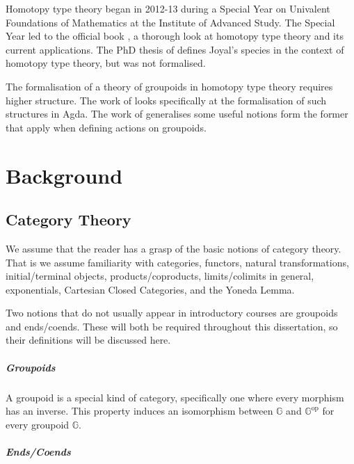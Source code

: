 \documentclass[12pt, parskip, DIV=14]{scrbook}
\begin{document}
Homotopy type theory began in 2012-13 during a Special Year on Univalent Foundations of Mathematics at the Institute of Advanced Study. The Special Year led to the official book \citep{hottbook}, a thorough look at homotopy type theory and its current applications. The PhD thesis of \citet{yorgey2014combinatorial} defines Joyal's species in the context of homotopy type theory, but was not formalised.

The formalisation of a theory of groupoids in homotopy type theory requires higher structure. The work of \citet{hou2017higher} looks specifically at the formalisation of such structures in Agda. The work of \citet{kraus2014general} generalises some useful notions form the former that apply when defining actions on groupoids.

\chapter{Background}

\section{Category Theory}
\label{sec:cattheory}

We assume that the reader has a grasp of the basic notions of category theory. That is we assume familiarity with categories, functors, natural transformations, initial/terminal objects, products/coproducts, limits/colimits in general, exponentials, Cartesian Closed Categories, and the Yoneda Lemma.

Two notions that do not usually appear in introductory courses are groupoids and ends/coends. These will both be required throughout this dissertation, so their definitions will be discussed here.

\paragraph{Groupoids}

A groupoid is a special kind of category, specifically one where every morphism has an inverse. This property induces an isomorphism between $\mathbb{G}$ and $\mathbb{G}^\mathrm{op}$ for every groupoid $\mathbb{G}$.

\paragraph{Ends/Coends}
\end{document}
